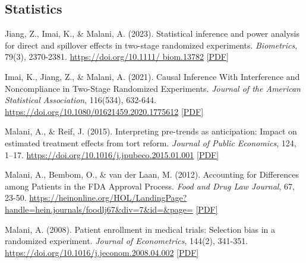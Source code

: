     \subsection*{Statistics}

    \begin{tablist}

        \item[2023] \tab{}Jiang, Z., Imai, K., \& Malani, A. (2023). Statistical inference and power analysis for direct and spillover effects in two-stage randomized experiments. \textit{Biometrics}, 79(3), 2370-2381. \href{https://doi.org/10.1111/biom.13782}{https://doi.org/10.1111/ biom.13782} \href{https://github.com/anup-malani/website_personal/blob/main/publications/2022_JiangImaiMalani_Biometrics_TwoStageExperiments.pdf}{[PDF]}
        
        \item[2021] \tab{}Imai, K., Jiang, Z., \& Malani, A. (2021). Causal Inference With Interference and Noncompliance in Two-Stage Randomized Experiments. \textit{Journal of the American Statistical Association}, 116(534), 632-644. \href{https://doi.org/10.1080/01621459.2020.1775612}{https://doi.org/10.1080/01621459.2020.1775612} \href{https://github.com/anup-malani/website_personal/blob/main/publications/2021_ImaiMalaniJiang_JASA_TwoStageExperiments.pdf}{[PDF]}

        \item[2015] \tab{}Malani, A., \& Reif, J. (2015). Interpreting pre-trends as anticipation: Impact on estimated treatment effects from tort reform. \textit{Journal of Public Economics}, 124, 1–17. \href{https://doi.org/10.1016/j.jpubeco.2015.01.001}{https://doi.org/10.1016/j.jpubeco.2015.01.001} \href{https://github.com/anup-malani/website_personal/blob/main/publications/2015_MalaniReif_JPubEc_Anticipation.pdf}{[PDF]}
        
        \item[2012] \tab{}Malani, A., Bembom, O., \& van der Laan, M. (2012). Accounting for Differences among Patients in the FDA Approval Process. \textit{Food and Drug Law Journal}, 67, 23-50. \href{https://heinonline.org/HOL/LandingPage?handle=hein.journals/foodlj67&div=7&id=&page=}{https://heinonline.org/HOL/LandingPage?handle=hein.journals/foodlj67\&div=7\&id=\&page=} \href{https://github.com/anup-malani/website_personal/blob/main/publications/2012_Malani_FDAHetergeneousTreatmentEffects.pdf}{[PDF]}
        
        \item[2008] \tab{}Malani, A. (2008). Patient enrollment in medical trials: Selection bias in a randomized experiment. \textit{Journal of Econometrics}, 144(2), 341-351. \href{https://doi.org/10.1016/j.jeconom.2008.04.002}{https://doi.org/10.1016/j.jeconom.2008.04.002}  \href{https://github.com/anup-malani/website_personal/blob/main/publications/2008_Malani_JMetrics_PatientEnrollment.pdf}{[PDF]} 
        

\end{tablist}
